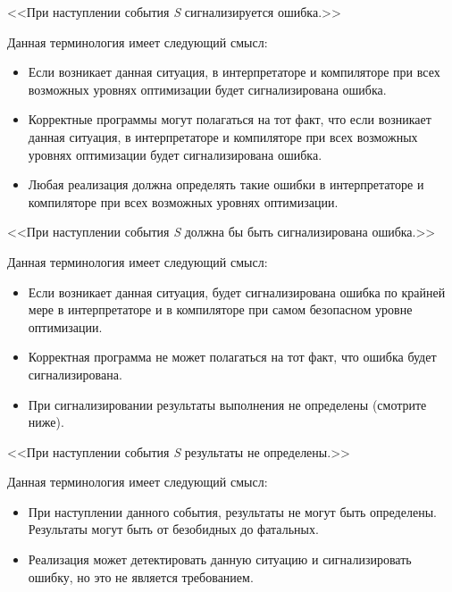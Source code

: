 \begin{flushdesc}

\item[<<При наступлении события \emph{S} сигнализируется ошибка.>>]

Данная терминология имеет следующий смысл:

\begin{itemize}
\item Если возникает данная ситуация, в интерпретаторе и компиляторе при всех
  возможных уровнях оптимизации будет сигнализирована ошибка.

\item Корректные программы могут полагаться на тот факт, что если возникает
  данная ситуация, в интерпретаторе и компиляторе при всех возможных уровнях
  оптимизации будет сигнализирована ошибка.

\item Любая реализация должна определять такие ошибки в  интерпретаторе и
  компиляторе при всех возможных уровнях оптимизации. 
\end{itemize}

\item[<<При наступлении события \emph{S} должна бы быть сигнализирована ошибка.>>]
  
  Данная терминология имеет следующий смысл:
  
  \begin{itemize}
  \item Если возникает данная ситуация, будет сигнализирована ошибка по
    крайней мере в интерпретаторе и в компиляторе при самом безопасном уровне
    оптимизации.
    
  \item Корректная программа не может полагаться на тот факт, что ошибка будет
    сигнализирована.
    
  \item При сигнализировании результаты выполнения не определены (смотрите
    ниже).
  \end{itemize}
\item[<<При наступлении события \emph{S} результаты не определены.>>]

  Данная терминология имеет следующий смысл:
  
  \begin{itemize}
  \item При наступлении данного события, результаты не могут быть
    определены. Результаты могут быть от безобидных до фатальных.
    
  \item Реализация может детектировать данную ситуацию и сигнализировать ошибку,
    но это не является требованием.
    

\end{itemize}
\end{flushdesc}
